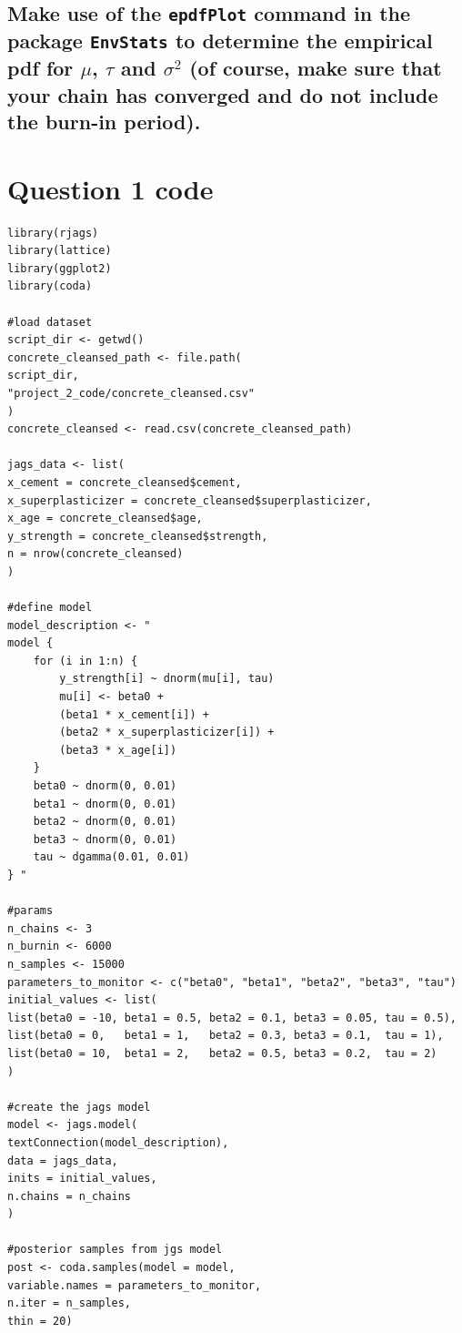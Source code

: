 \documentclass[]{article}
\begin{document}
\subsection{Make use of the \texttt{epdfPlot} command in the package \texttt{EnvStats} to determine the empirical pdf for $\mu$, $\tau$ and $\sigma^2$ (of course, make sure that your chain has converged and do not include the burn-in period).}





\appendix

\section{Question 1 code} \label{appendix:a}

\begin{lstlisting}
library(rjags)
library(lattice)
library(ggplot2)
library(coda)

#load dataset
script_dir <- getwd()
concrete_cleansed_path <- file.path(
script_dir,
"project_2_code/concrete_cleansed.csv"
)
concrete_cleansed <- read.csv(concrete_cleansed_path)

jags_data <- list(
x_cement = concrete_cleansed$cement,
x_superplasticizer = concrete_cleansed$superplasticizer,
x_age = concrete_cleansed$age,
y_strength = concrete_cleansed$strength,
n = nrow(concrete_cleansed)
)

#define model
model_description <- "
model {
	for (i in 1:n) {
		y_strength[i] ~ dnorm(mu[i], tau)
		mu[i] <- beta0 +
		(beta1 * x_cement[i]) +
		(beta2 * x_superplasticizer[i]) +
		(beta3 * x_age[i])
	}
	beta0 ~ dnorm(0, 0.01)
	beta1 ~ dnorm(0, 0.01)
	beta2 ~ dnorm(0, 0.01)
	beta3 ~ dnorm(0, 0.01)
	tau ~ dgamma(0.01, 0.01)
} "

#params
n_chains <- 3
n_burnin <- 6000
n_samples <- 15000
parameters_to_monitor <- c("beta0", "beta1", "beta2", "beta3", "tau")
initial_values <- list(
list(beta0 = -10, beta1 = 0.5, beta2 = 0.1, beta3 = 0.05, tau = 0.5),
list(beta0 = 0,   beta1 = 1,   beta2 = 0.3, beta3 = 0.1,  tau = 1),
list(beta0 = 10,  beta1 = 2,   beta2 = 0.5, beta3 = 0.2,  tau = 2)
)

#create the jags model
model <- jags.model(
textConnection(model_description),
data = jags_data,
inits = initial_values,
n.chains = n_chains
)

#posterior samples from jgs model
post <- coda.samples(model = model,
variable.names = parameters_to_monitor,
n.iter = n_samples,
thin = 20)



\end{lstlisting}
\end{document}
